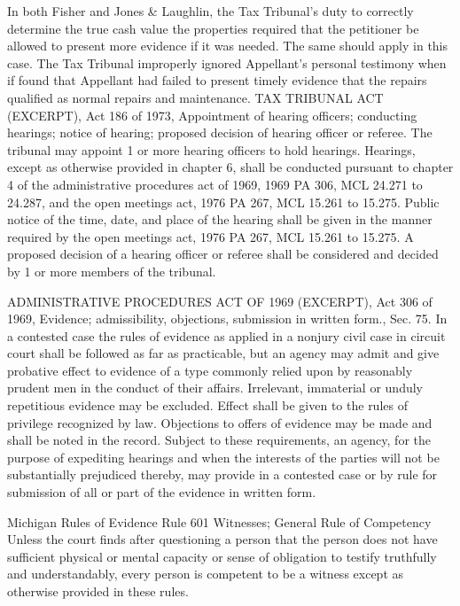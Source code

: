 	In both Fisher and Jones & Laughlin, the Tax Tribunal's duty to correctly determine the true cash value the properties required that the petitioner be allowed to present more evidence if it was needed. The same should apply in this case. 
The Tax Tribunal improperly ignored Appellant's personal testimony when if found that Appellant had failed to present timely evidence that the repairs qualified as normal repairs and maintenance.
TAX TRIBUNAL ACT (EXCERPT), Act 186 of 1973,  Appointment of hearing officers; conducting hearings; notice of hearing; proposed decision of hearing officer or referee.
The tribunal may appoint 1 or more hearing officers to hold hearings. Hearings, except as otherwise provided in chapter 6, shall be conducted pursuant to chapter 4 of the administrative procedures act of 1969, 1969 PA 306, MCL 24.271 to 24.287, and the open meetings act, 1976 PA 267, MCL 15.261 to 15.275. Public notice of the time, date, and place of the hearing shall be given in the manner required by the open meetings act, 1976 PA 267, MCL 15.261 to 15.275. A proposed decision of a hearing officer or referee shall be considered and decided by 1 or more members of the tribunal.
 
ADMINISTRATIVE PROCEDURES ACT OF 1969 (EXCERPT), Act 306 of 1969,  Evidence; admissibility, objections, submission in written form., Sec. 75.
In a contested case the rules of evidence as applied in a nonjury civil case in circuit court shall be followed as far as practicable, but an agency may admit and give probative effect to evidence of a type commonly relied upon by reasonably prudent men in the conduct of their affairs. Irrelevant, immaterial or unduly repetitious evidence may be excluded. Effect shall be given to the rules of privilege recognized by law. Objections to offers of evidence may be made and shall be noted in the record. Subject to these requirements, an agency, for the purpose of expediting hearings and when the interests of the parties will not be substantially prejudiced thereby, may provide in a contested case or by rule for submission of all or part of the evidence in written form.

Michigan Rules of Evidence Rule 601 Witnesses; General Rule of Competency
Unless the court finds after questioning a person that the person does not have
sufficient physical or mental capacity or sense of obligation to testify truthfully and
understandably, every person is competent to be a witness except as otherwise
provided in these rules.
 
